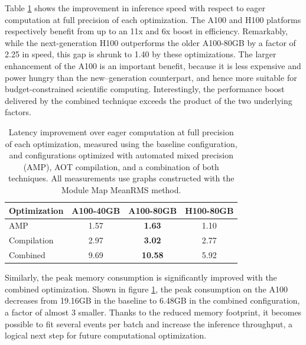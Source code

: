 Table \ref{tab:gnn-comp-improve} shows the improvement in inference speed with respect to eager computation at full precision of each optimization. 
The A100 and H100 platforms respectively benefit from up to an 11x and 6x boost in efficiency. 
Remarkably, while the next-generation H100 outperforms the older A100-80GB by a factor of 2.25 in speed, this gap is shrunk to 1.40 by these optimizations. 
The larger enhancement of the A100 is an important benefit, because it is less expensive and power hungry than the new--generation counterpart, and hence more suitable for budget-constrained scientific computing. 
Interestingly, the performance boost delivered by the combined technique exceeds the product of the two underlying factors. 

\begin{table}[h!]
    \centering
    \begin{tabular}{|l|c|c|c|} \hline
        Optimization & {A100-40GB} & {A100-80GB} & {H100-80GB} \\ \hline\hline
        AMP & 1.57 & \textbf{1.63} & 1.10 \\
        Compilation & 2.97 & \textbf{3.02} & 2.77 \\
        Combined & 9.69 & \textbf{10.58} & 5.92 \\ \hline
    \end{tabular}
    \caption{Latency improvement over eager computation at full precision of each optimization, measured using the baseline configuration, and configurations optimized with automated mixed precision (AMP), AOT compilation, and a combination of both techniques. All measurements use graphs constructed with the Module Map MeanRMS method.}
    \label{tab:gnn-comp-improve}
\end{table}

Similarly, the peak memory consumption is significantly improved with the combined optimization.
Shown in figure \ref{tab:gnn-comp-improve}, the peak consumption on the A100 decreases from 19.16GB in the baseline to 6.48GB in the combined configuration, a factor of almost 3 smaller. 
Thanks to the reduced memory footprint, it becomes possible to fit several events per batch and increase the inference throughput, a logical next step for future computational optimization. 

